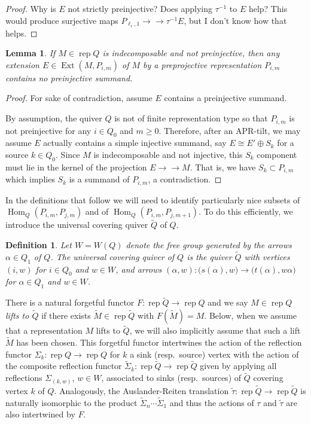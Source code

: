 \documentclass{amsart}
\newtheorem{definition}[theorem]{Definition}
\newtheorem{lemma}[theorem]{Lemma}
\numberwithin{equation}{section}
\newcommand{\onto}{\to\!\!\!\!\!\to}
\newcommand{\Ext}{\operatorname{Ext}}
\newcommand{\Hom}{\operatorname{Hom}}
\newcommand{\rep}{\operatorname{rep}}
\begin{document}
\begin{proof}
  Why is $E$ not strictly preinjective?  Does applying $\tau^{-1}$ to $E$ help?  
  This would produce surjective maps $P_{\ell_i,1}\onto \tau^{-1} E$, but I don't know how that helps.
\end{proof}


\begin{lemma}
  \label{le:nonpreinjective extensions}
  If $M\in\rep Q$ is indecomposable and not preinjective, then any extension $E\in\Ext(M,P_{i,m})$ of $M$ by a preprojective representation $P_{i,m}$ contains no preinjective summand.
\end{lemma}
\begin{proof}
  For sake of contradiction, assume $E$ contains a preinjective summand.

  By assumption, the quiver $Q$ is not of finite representation type so that $P_{i,m}$ is not preinjective for any $i\in Q_0$ and $m\ge0$.
  Therefore, after an APR-tilt, we may assume $E$ actually contains a simple injective summand, say $E\cong E'\oplus S_k$ for a source $k\in Q_0$.
  Since $M$ is indecomposable and not injective, this $S_k$ component must lie in the kernel of the projection $E\onto M$.
  That is, we have $S_k\subset P_{i,m}$ which implies $S_k$ is a summand of $P_{i,m}$, a contradiction.
\end{proof}

In the definitions that follow we will need to identify particularly nice subsets of $\Hom_Q(P_{i,m},P_{j,m})$ and of $\Hom_Q(P_{i,m},P_{j,m+1})$.
To do this efficiently, we introduce the universal covering quiver $\widetilde{Q}$ of $Q$.
\begin{definition}
  Let $W=W(Q)$ denote the free group generated by the arrows $\alpha\in Q_1$ of $Q$.
  The \emph{universal covering quiver} of $Q$ is the quiver $\widetilde{Q}$ with vertices $(i,w)$ for $i\in Q_0$ and $w\in W$, and arrows $(\alpha,w):\big(s(\alpha),w\big)\to \big(t(\alpha),w \alpha \big)$ for $\alpha\in Q_1$ and $w\in W$.
\end{definition}
There is a natural forgetful functor $F:\rep\widetilde{Q}\to\rep Q$ and we say $M\in\rep Q$ \emph{lifts to $\widetilde{Q}$} if there exists $\widetilde{M}\in\rep\widetilde{Q}$ with $F(\widetilde{M})=M$.
Below, when we assume that a representation $M$ lifts to $\widetilde{Q}$, we will also implicitly assume that such a lift $\widetilde{M}$ has been chosen.
This forgetful functor intertwines the action of the reflection functor $\Sigma_k:\rep Q\to\rep Q$ for $k$ a sink (resp.~source) vertex with the action of the composite reflection functor $\widetilde{\Sigma}_k:\rep\widetilde{Q}\to\rep\widetilde{Q}$ given by applying all reflections $\Sigma_{(k,w)}$, $w\in W$, associated to sinks (resp.~sources) of $\widetilde{Q}$ covering vertex $k$ of $Q$.
Analogously, the Auslander-Reiten translation $\tilde\tau:\rep\widetilde{Q}\to\rep\widetilde{Q}$ is naturally isomorphic to the product $\widetilde{\Sigma}_n\cdots\widetilde{\Sigma}_1$ and thus the actions of $\tau$ and $\tilde{\tau}$ are also intertwined by $F$. 
\end{document}

